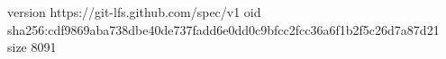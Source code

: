 version https://git-lfs.github.com/spec/v1
oid sha256:cdf9869aba738dbe40de737fadd6e0dd0c9bfcc2fcc36a6f1b2f5c26d7a87d21
size 8091
